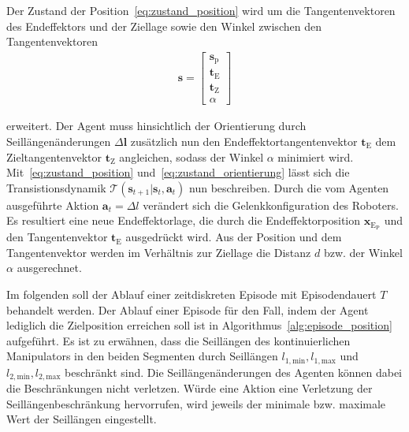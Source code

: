 Der Zustand der Position~\eqref{eq:zustand_position} wird um die Tangentenvektoren des Endeffektors und der Ziellage sowie den Winkel zwischen den Tangentenvektoren
\begin{align}
\bm{s} = 
\begin{bmatrix}
\bm{s}_{\mathrm{p}} \\ \bm{t}_{\mathrm{E}} \\ \bm{t}_{\mathrm{Z}} \\ \alpha
\end{bmatrix}
\label{eq:zustand_orientierung}
\end{align} 

erweitert. Der Agent muss hinsichtlich der Orientierung durch Seillängenänderungen $\Delta\bm{l}$ zusätzlich nun den Endeffektortangentenvektor $\bm{t}_{\mathrm{E}}$ dem Zieltangentenvektor $\bm{t}_{\mathrm{Z}}$ angleichen, sodass der Winkel $\alpha$ minimiert wird.
Mit~\eqref{eq:zustand_position} und~\eqref{eq:zustand_orientierung} lässt sich die Transistionsdynamik $\mathcal{T}( \bm{s}_{t+1} | \bm{s}_t, \bm{a}_t)$ nun beschreiben. Durch die vom Agenten ausgeführte Aktion $\bm{a}_t = \Delta l$ verändert sich die Gelenkkonfiguration des Roboters. Es resultiert eine neue Endeffektorlage, die durch die Endeffektorposition $\bm{x}_{\mathrm{E}_{\mathrm{P}}}$ und den Tangentenvektor $\bm{t}_{\mathrm{E}}$ ausgedrückt wird. Aus der Position und dem Tangentenvektor werden im Verhältnis zur Ziellage die Distanz $d$ bzw. der Winkel $\alpha$ ausgerechnet. 

Im folgenden soll der Ablauf einer zeitdiskreten Episode mit Episodendauert $T$ behandelt werden. Der Ablauf einer Episode für den Fall, indem der Agent lediglich die Zielposition erreichen soll ist in Algorithmus~\ref{alg:episode_position} aufgeführt. Es ist zu erwähnen, dass die Seillängen des kontinuierlichen Manipulators in den beiden Segmenten durch Seillängen $l_{1,\mathrm{min}}, l_{1,\mathrm{max}}$ und $l_{2,\mathrm{min}}, l_{2,\mathrm{max}}$ beschränkt sind. Die Seillängenänderungen des Agenten können dabei die Beschränkungen nicht verletzen. Würde eine Aktion eine Verletzung der Seillängenbeschränkung hervorrufen, wird jeweils der minimale bzw. maximale Wert der Seillängen eingestellt. 

